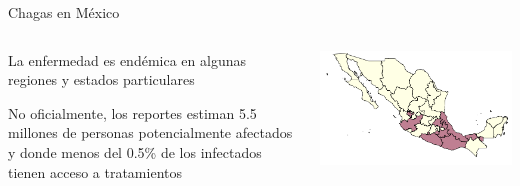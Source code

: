 \documentclass[xcolor=x11names]{beamer}
\begin{document}
\begin{frame}{Chagas en México}
	\begin{columns}
		\begin{column}{0.3\textwidth}

			La enfermedad es endémica en algunas regiones y estados particulares


			\medskip No oficialmente, los reportes estiman 5.5 millones de personas potencialmente afectados y donde menos del 0.5\% de los infectados tienen acceso a tratamientos


		\end{column}
		\begin{column}{0.7\textwidth}
			\includegraphics[width=\textwidth]{slides/Ambientes_Gran_Chaco-Mexico_original.png}
		\end{column}
	\end{columns}
\end{frame}
\end{document}
